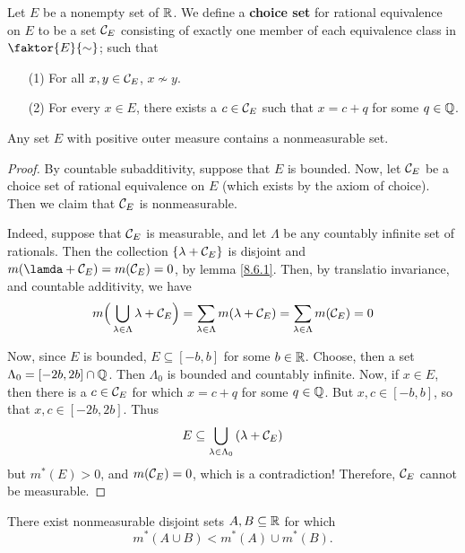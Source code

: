 \begin{definition}
    Let $E$ be a nonempty set of  $\mathbb{R}$. We define a  \textbf{choice set} for
    rational equivalence on $E$ to be a set  $\mathcal{C}_E$ consisting of exactly one
    member of each equivalence class in  $\faktor{E}{\sim}$; such that
    \begin{enumerate}
        \item[(1)] For all $x,y \in \mathcal{C}_E$,  $x \not\sim y$.

        \item[(2)] For every $x \in E$, there exists a $c \in \mathcal{C}_E$ such that
            $x=c+q$ for some  $q \in \mathbb{Q}$.
    \end{enumerate}
\end{definition}

\begin{theorem}\label{8.6.3}
    Any set $E$ with positive outer measure contains a nonmeasurable set.
\end{theorem}
\begin{proof}
    By countable subadditivity, suppose that $E$ is bounded. Now, let  $\mathcal{C}_E$
    be a choice set of rational equivalence on $E$ (which exists by the axiom of
    choice). Then we claim that $\mathcal{C}_E$ is nonmeasurable.

    Indeed, suppose that $\mathcal{C}_E$ is measurable, and let $\Lambda$ be any
    countably infinite set of rationals. Then the collection  $\{\lambda+\mathcal{C}_E\}$ is
    disjoint and $m(\lamda+\Cc_E)=m(\Cc_E)=0$, by lemma \ref{8.6.1}. Then, by
    translatio invariance, and countable additivity, we have
    \begin{equation*}
        m\Big{(} \bigcup_{\lambda \in \Lambda}{\lambda+\mathcal{C}_E} \Big{)}=
        \sum_{\lambda \in \Lambda}{m(\lambda+\mathcal{C}_E)}=\sum_{\lambda \in \Lambda}{m(\mathcal{C}_E)}=0
    \end{equation*}

    Now, since $E$ is bounded,  $E \subseteq [-b,b]$ for some $b \in \mathbb{R}$.
    Choose, then a set  $\Lambda_0=[-2b,2b] \cap \mathbb{Q}$. Then $\Lambda_0$ is
    bounded and countably infinite. Now, if $x \in E$, then there is a  $c \in
    \mathcal{C}_E$ for which  $x=c+q$ for some  $q \in \mathbb{Q}$. But  $x,c \in [-b,b]$, so
    that $x,c \in [-2b,2b]$. Thus
    \begin{equation*}
        E \subseteq \bigcup_{\lambda \in \Lambda_0}{(\lambda+\mathcal{C}_E)}
    \end{equation*}
    but $m^\ast(E)>0$, and $m(\mathcal{C}_E)=0$, which is a contradiction! Therefore,
    $\mathcal{C}_E$ cannot be measurable.
\end{proof}

\begin{theorem}\label{8.6.4}
    There exist nonmeasurable disjoint sets $A,B \subseteq \mathbb{R}$ for which
    \begin{equation*}
        m^\ast(A \cup B)<m^\ast(A) \cup m^\ast(B).
    \end{equation*}
\end{theorem}
